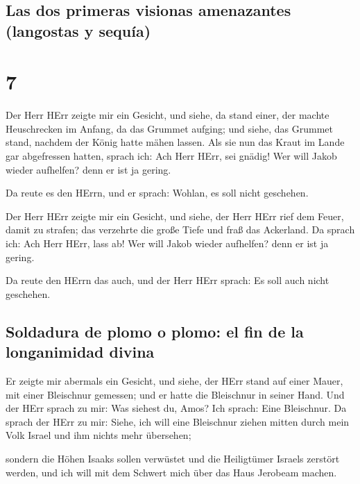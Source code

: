 \hypertarget{las-dos-primeras-visionas-amenazantes-langostas-y-sequuxeda}{%
\subsection{Las dos primeras visionas amenazantes (langostas y
sequía)}\label{las-dos-primeras-visionas-amenazantes-langostas-y-sequuxeda}}

\hypertarget{section-6}{%
\section{7}\label{section-6}}

 Der Herr HErr zeigte mir ein Gesicht, und siehe, da stand
einer, der machte Heuschrecken im Anfang, da das Grummet aufging; und
siehe, das Grummet stand, nachdem der König hatte mähen lassen.
 Als sie nun das Kraut im Lande gar abgefressen hatten,
sprach ich: Ach Herr HErr, sei gnädig! Wer will Jakob wieder aufhelfen?
denn er ist ja gering.

 Da reute es den HErrn, und er sprach: Wohlan, es soll
nicht geschehen.

 Der Herr HErr zeigte mir ein Gesicht, und siehe, der Herr
HErr rief dem Feuer, damit zu strafen; das verzehrte die große Tiefe und
fraß das Ackerland.  Da sprach ich: Ach Herr HErr, lass
ab! Wer will Jakob wieder aufhelfen? denn er ist ja gering.

 Da reute den HErrn das auch, und der Herr HErr sprach: Es
soll auch nicht geschehen.

\hypertarget{soldadura-de-plomo-o-plomo-el-fin-de-la-longanimidad-divina}{%
\subsection{Soldadura de plomo o plomo: el fin de la longanimidad
divina}\label{soldadura-de-plomo-o-plomo-el-fin-de-la-longanimidad-divina}}

 Er zeigte mir abermals ein Gesicht, und siehe, der HErr
stand auf einer Mauer, mit einer Bleischnur gemessen; und er hatte die
Bleischnur in seiner Hand.  Und der HErr sprach zu mir:
Was siehest du, Amos? Ich sprach: Eine Bleischnur. Da sprach der HErr zu
mir: Siehe, ich will eine Bleischnur ziehen mitten durch mein Volk
Israel und ihm nichts mehr übersehen;

 sondern die Höhen Isaaks sollen verwüstet und die
Heiligtümer Israels zerstört werden, und ich will mit dem Schwert mich
über das Haus Jerobeam machen.

